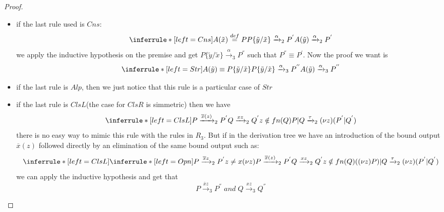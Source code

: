 \begin{theorem}
\begin{proof}
\begin{description}
\begin{description}
\begin{itemize}
		\[
		  \inferrule* [left=Str]{
		      P|Q\equiv Q|P
		    \\
		      \inferrule* [left=Par]{
			  Q\xrightarrow{\alpha}_{3}Q^{''}
			\\
			  bn(\alpha)\cap fn(Q)=\emptyset
		      }{
			  Q|P\xrightarrow{\alpha}_{3}Q^{''}|P
		      }
		    }{
		      P|Q\xrightarrow{\alpha}_{3}Q^{''}|P
		    }
		\]
		and $Q^{''}|P\equiv P|Q^{'}$
	      \item
		if the last rule used is $Cns$:
		\[
		    \inferrule* [left=Cns]{
			A(\tilde{x})\stackrel{def}{=}P
		      \\
			P\{\tilde{y}/\tilde{x}\}\xrightarrow{\alpha}_{2}P^{'}
		    }{
		      A(\tilde{y})\xrightarrow{\alpha}_{2}P^{'}
		    }
		\]
		we apply the inductive hypothesis on the premise and get $P\{\tilde{y}/\tilde{x}\}\xrightarrow{\alpha}_{3}P^{''}$ such that $P^{''}\equiv P^{'}$. Now the proof we want is
		\[
		    \inferrule* [left=Str]{
			A(\tilde{y})\equiv P\{\tilde{y}/\tilde{x}\}
		      \\
			P\{\tilde{y}/\tilde{x}\}\xrightarrow{\alpha}_{3}P^{''}
		    }{
		      A(\tilde{y})\xrightarrow{\alpha}_{3}P^{''}
		    }
		\]		
	      \item
		if the last rule is $Alp$, then we just notice that this rule is a particular case of $Str$
	      \item
		if the last rule is $ClsL$(the case for $ClsR$ is simmetric) then we have
		\[
		    \inferrule* [left=ClsL]{
			P\xrightarrow{\overline{x}(z)}_{2}P^{'}
		      \\
			Q\xrightarrow{xz}_{2}Q^{'}
		      \\
			z\notin fn(Q)
		    }{
		      P|Q\xrightarrow{\tau}_{2}(\nu z)(P^{'}|Q^{'})
		    }
		\]
		there is no easy way to mimic this rule with the rules in $R_{3}$. But if in the derivation tree we have an introduction of the bound output $\overline{x}(z)$ followed directly by an elimination of the same bound output such as:
		\[
		    \inferrule* [left=ClsL]{
			\inferrule* [left=Opn]{
			    P\xrightarrow{\overline{x}z}_{2}P^{'}
			  \\
			    z\neq x
			}{
			  (\nu z)P\xrightarrow{\overline{x}(z)}_{2}P^{'}
			}
		      \\
			Q\xrightarrow{xz}_{2}Q^{'}
		      \\
			z\notin fn(Q)
		    }{
		      ((\nu z)P)|Q\xrightarrow{\tau}_{2}(\nu z)(P^{'}|Q^{'})
		    }
		\]
		we can apply the inductive hypothesis and get that 
		\[
		  P\xrightarrow{\overline{x}z}_{3}P^{''}\; and\; Q\xrightarrow{xz}_{3}Q^{''}
\]
\end{itemize}
\end{description}
\end{description}
\end{proof}
\end{theorem}
